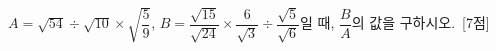 $A=\sqrt{54}\div\sqrt{10}\times\sqrt{\dfrac{5}{9}}$, $B=\dfrac{\sqrt{15}}{\sqrt{24}}\times\dfrac{6}{\sqrt{3}}\div\dfrac{\sqrt{5}}{\sqrt{6}}$일 때, $\dfrac{B}{A}$의 값을 구하시오.~\mbox{\mbox{[7점]}}
